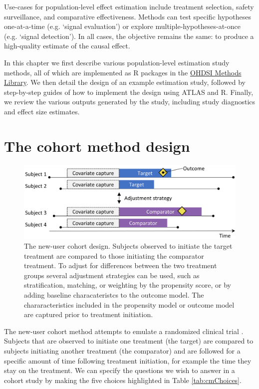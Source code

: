 \documentclass[11pt]{book}
\begin{document}
Use-cases for population-level effect estimation include treatment
selection, safety surveillance, and comparative effectiveness. Methods
can test specific hypotheses one-at-a-time (e.g. `signal evaluation') or
explore multiple-hypotheses-at-once (e.g. `signal detection'). In all
cases, the objective remains the same: to produce a high-quality
estimate of the causal effect.

In this chapter we first describe various population-level estimation
study methods, all of which are implemented as R packages in the
\href{https://ohdsi.github.io/MethodsLibrary/}{OHDSI Methods Library}.
We then detail the design of an example estimation study, followed by
step-by-step guides of how to implement the design using ATLAS and R.
Finally, we review the various outputs generated by the study, including
study diagnostics and effect size estimates.

\section{The cohort method design}\label{CohortMethod}

\begin{figure}

{\centering \includegraphics[width=0.9\linewidth]{images/PopulationLevelEstimation/cohortMethod} 

}

\caption{The new-user cohort design. Subjects observed to initiate the target treatment are compared to those initiating the comparator treatment. To adjust for differences between the two treatment groups several adjustment strategies can be used, such as stratification, matching, or weighting by the propensity score, or by adding baseline characateristcs to the outcome model. The chararacteristics included in the propensity model or outcome model are captured prior to treatment initiation.}\label{fig:cohortMethod}
\end{figure}

The new-user cohort method attempts to emulate a randomized clinical
trial \citep{hernan_2016}. Subjects that are observed to initiate one
treatment (the target) are compared to subjects initiating another
treatment (the comparator) and are followed for a specific amount of
time following treatment initiation, for example the time they stay on
the treatment. We can specify the questions we wish to answer in a
cohort study by making the five choices highlighted in Table
\ref{tab:cmChoices}.
\end{document}
